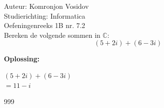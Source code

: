 \documentclass[a4paper]{article}
\begin{document}
	
	\noindent \large Auteur: Komronjon Vosidov \\
	\noindent \large Studierichting: Informatica\\
	\noindent \large Oefeningenreeks 1B nr. 7.2\\
	
	
	
	\normalsize
	Bereken de volgende sommen in $\mathbb{C}$:
	\begin{equation*}
		(5+2i)+(6-3i)
	\end{equation*}
	
	
	\noindent \textbf{Oplossing:}
	
	$(5+2i)+(6-3i)$ \\	
	
	$= 11-i $ \\
	
\begin{thebibliography}{999}
	
\end{thebibliography}	
	
	
\end{document}
